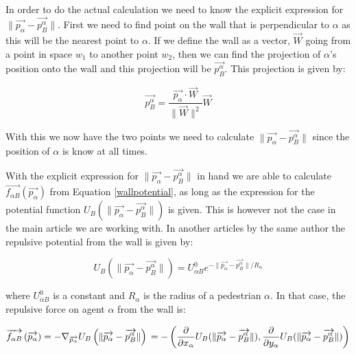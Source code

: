 In order to do the actual calculation we need to know the explicit expression for 
$ \| \overrightarrow{p_{\alpha}} - \overrightarrow{p_{B}^{\alpha}} \|$. First we need to find point on the wall 
that is perpendicular to $\alpha$ as this will be the nearest point to $\alpha$. If we define 
the wall as a vector, $\overrightarrow{W}$ going from a point in space $w_1$ to another point $w_2$, then 
we can find the projection of $\alpha$'s position onto the wall and this projection will be 
$\overrightarrow{p_{B}^{\alpha}}$. This projection is given by:

\begin{equation}\label{wall}
\overrightarrow{p_{B}^{\alpha}}=\frac{\overrightarrow{p_{\alpha}}\cdot \overrightarrow{W}}{\| \overrightarrow{W} \|^2}\overrightarrow{W}
\end{equation}

With this we now have the two points we need to calculate $\|\overrightarrow{p_{\alpha}} - \overrightarrow{p_{B}^{\alpha}}\|$ 
since the position of $\alpha$ is know at all times.

With the explicit expression for $ \| \overrightarrow{p_{\alpha}} - \overrightarrow{p_{B}^{\alpha}} \| $ 
in hand we are able to calculate $\overrightarrow{f_{\alpha B}} \left( \overrightarrow{p_{\alpha}} \right)$ from 
Equation \ref{wallpotential}, as long as the expression for the potential function 
$U_{B}\left( \| \overrightarrow{p_{\alpha}} - \overrightarrow{p_{B}^{\alpha}} \| \right)$ is given. This is 
however not the case in the main article we are working with. In another articles \cite{ABconstant} by 
the same author the repulsive potential from the wall is given by: 

\begin{equation}
U_{B} \left( \| \overrightarrow{p_{\alpha}} - \overrightarrow{p_{B}^{\alpha}} \| \right) =
U^0_{\alpha B} e^{- \| \overrightarrow{p_{\alpha}} - \overrightarrow{p_{B}^{\alpha}} \| / R_{\alpha} }
\end{equation}

where $U^0_{\alpha B}$ is a constant and $R_{\alpha}$ is the radius of a pedestrian $\alpha$.
In that case, the repulsive force on agent $ \alpha $ from the wall is:

\begin{equation}
    \overrightarrow{f_{\alpha B}} \left( \overrightarrow{p_{\alpha}} \right) =
    - \nabla_{\overrightarrow{p_{\alpha}}} U_{B}
    \left( \| \overrightarrow{p_{\alpha}} - \overrightarrow{p_{B}^{\alpha}} \| \right)\\
=-\left( \frac{\partial}{\partial x_{\alpha}}U_{B}( \| \overrightarrow{p_{\alpha}} - \overrightarrow{p_{B}^{\alpha}} \|), \frac{\partial}{\partial y_{\alpha}}U_{B}( \| \overrightarrow{p_{\alpha}} - \overrightarrow{p_{B}^{\alpha}} \|)\right)
\end{equation}

